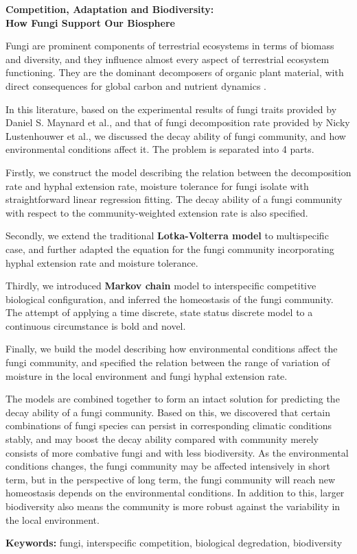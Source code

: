 \begin{center}
    \Large\bf Competition, Adaptation and Biodiversity:\\How Fungi Support Our Biosphere
\end{center}

Fungi are prominent components of terrestrial ecosystems in terms of biomass and diversity, and they influence almost every aspect of terrestrial ecosystem functioning. They are the dominant decomposers of organic plant material, with direct consequences for global carbon and nutrient dynamics \cite{Maynard-data}.

In this literature, based on the experimental results of fungi traits provided by Daniel S. Maynard et al., and that of fungi decomposition rate provided by Nicky Lustenhouwer et al., we discussed the decay ability of fungi community, and how environmental conditions affect it. The problem is separated into 4 parts.

Firstly, we construct the model describing the relation between the decomposition rate and hyphal extension rate, moisture tolerance for fungi isolate with straightforward linear regression fitting. The decay ability of a fungi community with respect to the community-weighted extension rate is also specified.

Secondly, we extend the traditional \textbf{Lotka-Volterra model} to multispecific case, and further adapted the equation for the fungi community incorporating hyphal extension rate and moisture tolerance.

Thirdly, we introduced \textbf{Markov chain} model to interspecific competitive biological configuration, and inferred the homeostasis of the fungi community. The attempt of applying a time discrete, state status discrete model to a continuous circumstance is bold and novel.

Finally, we build the model describing how environmental conditions affect the fungi community, and specified the relation between the range of variation of moisture in the local environment and fungi hyphal extension rate.

The models are combined together to form an intact solution for predicting the decay ability of a fungi community. Based on this, we discovered that certain combinations of fungi species can persist in corresponding climatic conditions stably, and may boost the decay ability compared with community merely consists of more combative fungi and with less biodiversity. As the environmental conditions changes, the fungi community may be affected intensively in short term, but in the perspective of long term, the fungi community will reach new homeostasis depends on the environmental conditions. In addition to this, larger biodiversity also means the community is more robust against  the variability in the local environment.

\begin{center}
    \textbf{Keywords:} fungi, interspecific competition, biological degredation, biodiversity
\end{center}